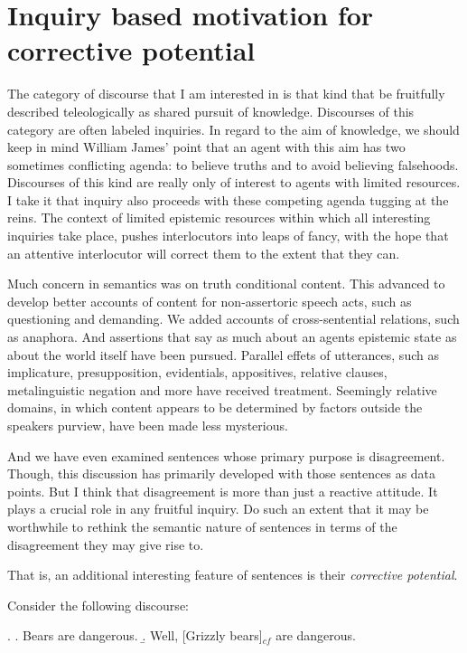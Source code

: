 \documentclass[letterpaper,10pt]{article}
\begin{document}
\section{Inquiry based motivation for corrective potential}

The category of discourse that I am interested in is that kind that be fruitfully described teleologically as shared pursuit of knowledge.  Discourses of this category are often labeled inquiries. In regard to the aim of knowledge, we should keep in mind William James' point that an agent with this aim has two sometimes conflicting agenda: to believe truths and to avoid believing falsehoods. Discourses of this kind are really only of interest to agents with limited resources.  I take it that inquiry also proceeds with these competing agenda tugging at the reins.  The context of limited epistemic resources within which all interesting inquiries take place, pushes interlocutors into leaps of fancy, with the hope that an attentive interlocutor will correct them to the extent that they can.

Much concern in semantics was on truth conditional content.
This advanced to develop better accounts of content for non-assertoric speech acts, such as questioning and demanding.
We added accounts of cross-sentential relations, such as anaphora.
And assertions that say as much about an agents epistemic state as about the world itself have been pursued.
Parallel effets of utterances, such as implicature, presupposition, evidentials, appositives, relative clauses, metalinguistic negation and more have received treatment.
Seemingly relative domains, in which content appears to be determined by factors outside the speakers purview, have been made less mysterious.

And we have even examined sentences whose primary purpose is disagreement.  Though, this discussion has primarily developed with those sentences as data points. But I think that disagreement is more than just a reactive attitude.  It plays a crucial role in any fruitful inquiry.  Do such an extent that it may be worthwhile to rethink the semantic nature of sentences in terms of the disagreement they may give rise to.  

That is, an additional interesting feature of sentences is their \textit{corrective potential}.

Consider the following discourse:

\ex. \a. Bears are dangerous.
\b. Well, [Grizzly bears]$_{cf}$ are dangerous.
\end{document}
